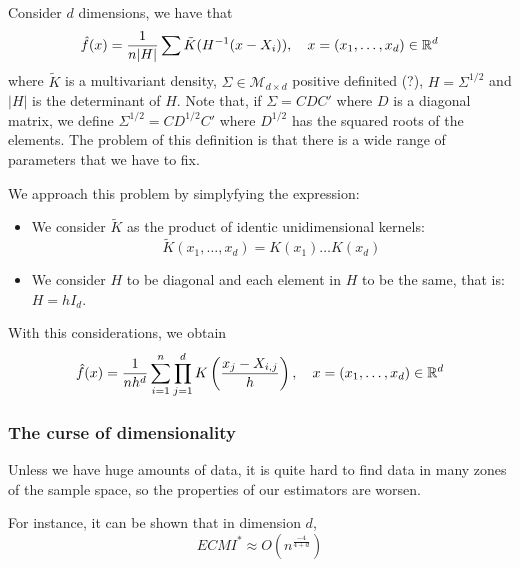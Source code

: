 Consider \(d\) dimensions, we have that
\[
\hat f(x) = \frac{1}{n|H|} \sum \tilde{K}(H^{-1}(x-X_i)), \quad x =(x_1,\dots,x_d) \in \mathbb{R}^d
\]
where \(\tilde K\) is a multivariant density, \(\Sigma \in \mathcal M_{d\times d}\) positive definited (?), \(H = \Sigma^{1/2}\) and \(|H|\) is the determinant of \(H\). Note that, if \(\Sigma = CDC'\) where \(D\) is a diagonal matrix, we define \(\Sigma^{1/2} = CD^{1/2}C'\) where \(D^{1/2}\) has the squared roots of the elements. The problem of this definition is that there is a wide range of parameters that we have to fix.

We approach this problem by simplyfying the expression:
\begin{itemize}
\item We consider \(\tilde K\) as the product of identic unidimensional kernels:
\[
\tilde K(x_1,\dots,x_d) = K(x_1)\dots K(x_d)
\]
\item We consider \(H\) to be diagonal and each element in \(H\) to be the same, that is: \(H = h I_d\).
\end{itemize}

With this considerations, we obtain
\[
\hat f(x) = \frac{1}{nh^d} \sum_{i=1}^n \prod_{j=1}^d K \left(\frac{x_j - X_{i,j}}{h}\right), \quad x=(x_1,\dots,x_d) \in \mathbb{R}^d
\]

\subsubsection{The curse of dimensionality}

Unless we have huge amounts of data, it is quite hard to find data in many zones of the sample space, so the properties of our estimators are worsen.

For instance, it can be shown that in dimension \(d\),
\[
ECMI^* \approx O(n^{\frac{-4}{4+d}})
\]
